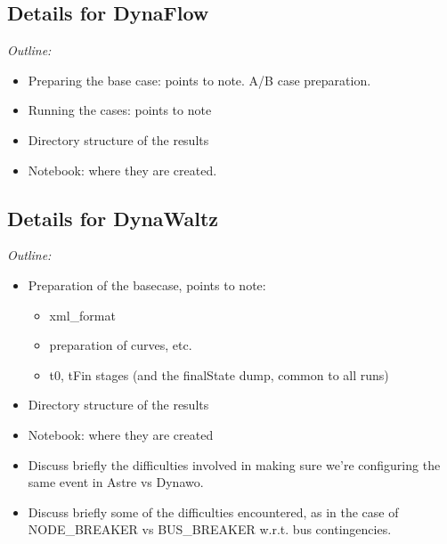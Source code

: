 \documentclass[conference]{IEEEtran}
\begin{document}
\subsection{Details for DynaFlow}
\begin{center}
  \itshape
  Outline:
  \begin{itemize}
    \item Preparing the base case: points to note. A/B case preparation.
    \item Running the cases: points to note
    \item Directory structure of the results
    \item Notebook: where they are created.
  \end{itemize}
\end{center}


\subsection{Details for DynaWaltz}
\begin{center}
  \itshape
  Outline:
  \begin{itemize}
    \item Preparation of the basecase, points to note:
          \begin{itemize}
            \item xml\_format
            \item preparation of curves, etc.
            \item t0, tFin stages (and the finalState dump, common to all runs)
          \end{itemize}
    \item Directory structure of the results
    \item Notebook: where they are created
    \item Discuss briefly the difficulties involved in making sure we're
          configuring the same event in Astre vs Dynawo.
    \item Discuss briefly some of the difficulties encountered, as in the
          case of NODE\_BREAKER vs BUS\_BREAKER w.r.t. bus contingencies.
  \end{itemize}
\end{center}



\end{document}
